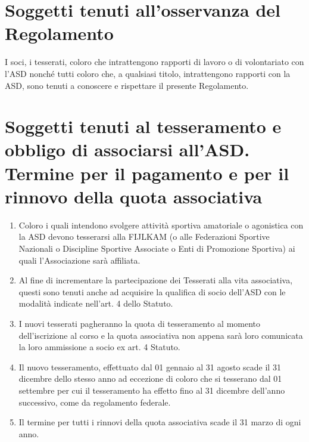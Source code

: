 \documentclass{djtsdoc}
\begin{document}
	\section{Soggetti tenuti all'osservanza del Regolamento}
	I soci, i tesserati, coloro che intrattengono rapporti di lavoro o di volontariato con l'ASD nonché tutti coloro che, a qualsiasi titolo, intrattengono rapporti con la ASD, sono tenuti a conoscere e rispettare il presente Regolamento.
	
	\section{Soggetti tenuti al tesseramento e obbligo di associarsi all'ASD. Termine per il pagamento e per il rinnovo della quota associativa}
	\begin{enumerate}
		\item Coloro i quali intendono svolgere attività sportiva amatoriale o agonistica con la ASD devono tesserarsi alla FIJLKAM (o alle Federazioni Sportive Nazionali o Discipline Sportive Associate o Enti di Promozione Sportiva) ai quali l'Associazione sarà affiliata.
		\item Al fine di incrementare la partecipazione dei Tesserati alla vita associativa, questi sono tenuti anche ad acquisire la qualifica di socio dell'ASD con le modalità indicate nell'art. 4 dello Statuto.
		\item I nuovi tesserati pagheranno la quota di tesseramento al momento dell'iscrizione al corso e la quota associativa non appena sarà loro comunicata la loro ammissione a socio ex art. 4 Statuto. 
		\item Il nuovo tesseramento, effettuato dal 01 gennaio al 31 agosto scade il 31 dicembre dello stesso anno ad eccezione di coloro che si tesserano dal 01 settembre per cui il tesseramento ha effetto fino al 31 dicembre dell'anno successivo, come da regolamento federale.
		\item Il termine per tutti i rinnovi della quota associativa scade il 31 marzo di ogni anno.
	\end{enumerate}
	
\end{document}
